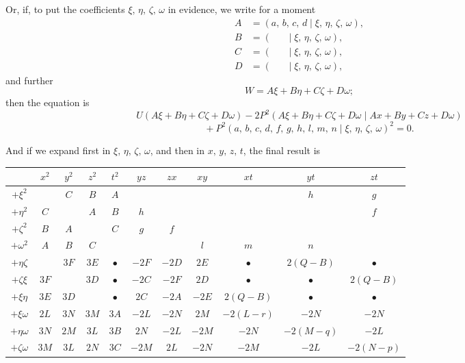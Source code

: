 \documentclass[11pt]{article}
\begin{document}
\noindent
Or, if, to put the coefficients $\xi,\,\eta,\,\zeta,\,\omega$ in evidence, we write for a moment
\begin{align*}
A &= (a,\,b,\,c,\,d \mid \xi,\,\eta,\,\zeta,\,\omega),\\
B &= (\quad\;\; \mid \xi,\,\eta,\,\zeta,\,\omega),\\
C &= (\quad\;\; \mid \xi,\,\eta,\,\zeta,\,\omega),\\
D &= (\quad\;\; \mid \xi,\,\eta,\,\zeta,\,\omega),
\end{align*}
and further
\[
W = A\xi + B\eta + C\zeta + D\omega;
\]
then the equation is
\[
U(A\xi + B\eta + C\zeta + D\omega) - 2P^2(A\xi + B\eta + C\zeta + D\omega \mid Ax + By + Cz + D\omega)
\]
\[
\qquad + P^2(a,\,b,\,c,\,d,\,f,\,g,\,h,\,l,\,m,\,n \mid \xi,\,\eta,\,\zeta,\,\omega)^2 = 0.
\]

\newpage

\noindent
And if we expand first in $\xi,\,\eta,\,\zeta,\,\omega$, and then in $x,\,y,\,z,\,t$, the final result is

\medskip

\begin{center}
\renewcommand{\arraystretch}{1.2}
\begin{tabular}{|c|cccccccccc|}
\hline
 & $x^2$ & $y^2$ & $z^2$ & $t^2$ & $yz$ & $zx$ & $xy$ & $xt$ & $yt$ & $zt$ \\
\hline
$+\xi^2$ &   &$C$&$B$&$A$&   &   &   &   &$h$&$g$\\
$+\eta^2$&$C$&   &$A$&$B$&$h$&   &   &   &   &$f$\\
$+\zeta^2$&$B$&$A$&   &$C$&$g$&$f$&   &   &   &   \\
$+\omega^2$&$A$&$B$&$C$&   &   &   &$l$&$m$&$n$&   \\
$+\eta\zeta$&   &$3F$&$3E$&$\bullet$&$-2F$& $-2D$ & $2E$ &$\bullet$&$2(Q-B)$&$\bullet$\\
$+\zeta\xi$&$3F$&   &$3D$&$\bullet$&$-2C$&$-2F$ &$2D$ &$\bullet$&$\bullet$&$2(Q-B)$\\
$+\xi\eta$&$3E$&$3D$&   &$\bullet$&$2C$ &$-2A$&$-2E$&$2(Q-B)$&$\bullet$&$\bullet$\\
$+\xi\omega$&$2L$&$3N$&$3M$&$3A$&$-2L$ &$-2N$&$2M$&$-2(L-r)$&$-2N$&$-2N$\\
$+\eta\omega$&$3N$&$2M$&$3L$&$3B$&$2N$ &$-2L$&$-2M$&$-2N$&$-2(M-q)$&$-2L$\\
$+\zeta\omega$&$3M$&$3L$&$2N$&$3C$&$-2M$&$2L$ &$-2N$&$-2M$&$-2L$&$-2(N-p)$\\
\hline
\end{tabular}
\end{center}
\end{document}
